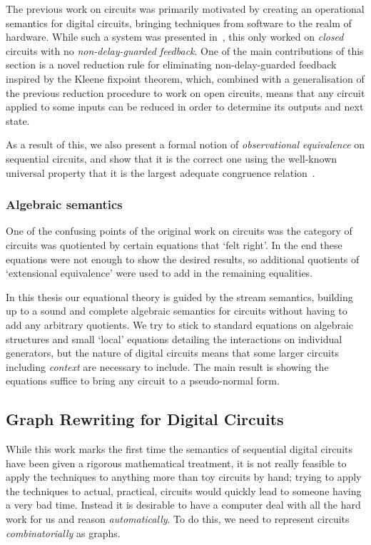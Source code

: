 The previous work on circuits was primarily motivated by creating an operational
semantics for digital circuits, bringing techniques from software to the realm
of hardware.
While such a system was presented in~\cite{ghica2017diagrammatic}, this only
worked on \emph{closed} circuits with no \emph{non-delay-guarded feedback}.
One of the main contributions of this section is a novel reduction rule for
eliminating non-delay-guarded feedback inspired by the Kleene fixpoint theorem,
which, combined with a generalisation of the previous reduction procedure to
work on open circuits, means that any circuit applied to some inputs can be
reduced in order to determine its outputs and next state.

As a result of this, we also present a formal notion of
\emph{observational equivalence} on sequential circuits, and show that it is the
correct one using the well-known universal property that it is the largest
adequate congruence relation~\cite{gordon1998operational}.

\subsubsection{Algebraic semantics}

One of the confusing points of the original work on circuits was the category
of circuits was quotiented by certain equations that `felt right'.
In the end these equations were not enough to show the desired results,
so additional quotients of `extensional equivalence' were used to add in the
remaining equalities.

In this thesis our equational theory is guided by the stream semantics,
building up to a sound and complete algebraic semantics for circuits without
having to add any arbitrary quotients.
We try to stick to standard equations on algebraic structures and small `local'
equations detailing the interactions on individual generators, but the nature of
digital circuits means that some larger circuits including \emph{context} are
necessary to include.
The main result is showing the equations suffice to bring any circuit to a
pseudo-normal form.

\subsection{Graph Rewriting for Digital Circuits}

While this work marks the first time the semantics of sequential digital
circuits have been given a rigorous mathematical treatment, it is not really
feasible to apply the techniques to anything more than toy circuits by hand;
trying to apply the techniques to actual, practical, circuits would quickly lead
to someone having a very bad time.
Instead it is desirable to have a computer deal with all the hard work
for us and reason \emph{automatically}.
To do this, we need to represent circuits \emph{combinatorially} as graphs.

